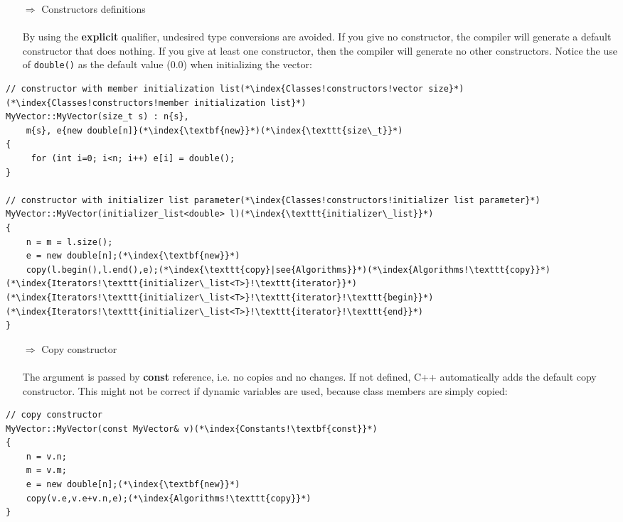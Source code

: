 \documentclass[10pt]{book}
\begin{document}
\begin{enumerate}
\item[$\Rightarrow$] Constructors definitions\\ \\ By using the \textbf{explicit} qualifier, undesired type conversions are avoided. If you give no constructor, the compiler will generate a default constructor that does nothing.
If you give at least one constructor, then the compiler will generate no other constructors. Notice the use of \texttt{double()} as the default value (0.0)
when initializing the vector:
\end{enumerate}
\begin{lstlisting}
// constructor with member initialization list(*\index{Classes!constructors!vector size}*)(*\index{Classes!constructors!member initialization list}*)
MyVector::MyVector(size_t s) : n{s},
    m{s}, e{new double[n]}(*\index{\textbf{new}}*)(*\index{\texttt{size\_t}}*)
{
     for (int i=0; i<n; i++) e[i] = double();
}

// constructor with initializer list parameter(*\index{Classes!constructors!initializer list parameter}*)
MyVector::MyVector(initializer_list<double> l)(*\index{\texttt{initializer\_list}}*)
{
    n = m = l.size();
    e = new double[n];(*\index{\textbf{new}}*)
    copy(l.begin(),l.end(),e);(*\index{\texttt{copy}|see{Algorithms}}*)(*\index{Algorithms!\texttt{copy}}*)(*\index{Iterators!\texttt{initializer\_list<T>}!\texttt{iterator}}*)(*\index{Iterators!\texttt{initializer\_list<T>}!\texttt{iterator}!\texttt{begin}}*)(*\index{Iterators!\texttt{initializer\_list<T>}!\texttt{iterator}!\texttt{end}}*)
}
\end{lstlisting}
\begin{enumerate}
\item[$\Rightarrow$] Copy constructor\\ \\ The argument is passed by \textbf{const} reference, i.e. no copies and no changes. If not defined, C++ automatically adds the default copy
constructor. This might not be correct if dynamic variables are used, because class members are simply copied:
\end{enumerate}
\begin{lstlisting}
// copy constructor
MyVector::MyVector(const MyVector& v)(*\index{Constants!\textbf{const}}*)
{
    n = v.n;
    m = v.m;
    e = new double[n];(*\index{\textbf{new}}*)
    copy(v.e,v.e+v.n,e);(*\index{Algorithms!\texttt{copy}}*)
}
\end{lstlisting}
\end{document}

